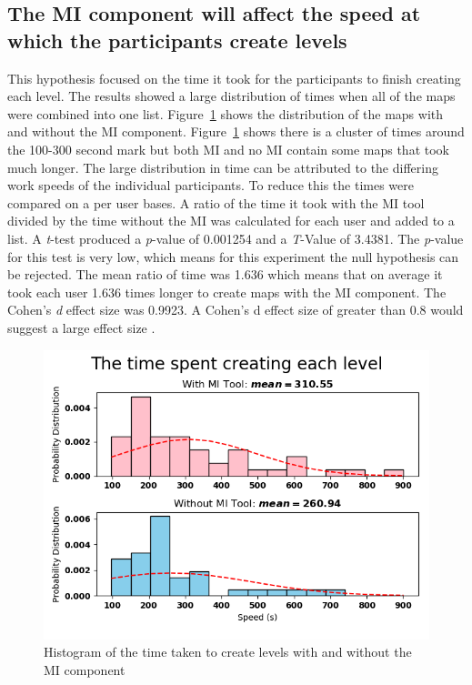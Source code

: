 \documentclass[journal]{IEEEtran}
\begin{document}
\subsection{The MI component will affect the speed at which the participants create levels}\label{speedSec}
This hypothesis focused on the time it took for the participants to finish creating each level. The results showed a large distribution of times when all of the maps were combined into one list.  Figure~\ref{speedDoubleHist} shows the distribution of the maps with and without the MI component. Figure~\ref{speedDoubleHist} shows there is a cluster of times around the 100-300 second mark but both MI and no MI contain some maps that took much longer. The large distribution in time can be attributed to the differing work speeds of the individual participants. To reduce this the times were compared on a per user bases. A ratio of the time it took with the MI tool divided by the time without the MI was calculated for each user and added to a list. A \textit{t}-test produced a \textit{p}-value of 0.001254 and a \textit{T}-Value of 3.4381. The \textit{p}-value for this test is very low, which means for this experiment the null hypothesis can be rejected. The mean ratio of time was 1.636 which means that on average it took each user 1.636 times longer to create maps with the MI component. The Cohen's \textit{d} effect size was 0.9923. A Cohen's d effect size of greater than 0.8 would suggest a large effect size \cite{cohen1988statistical}.

\begin{figure}[h]
	\includegraphics[width=1.0\linewidth]{Thetimespentcreatingeachlevel.png}
	\caption{Histogram of the time taken to create levels with and without the MI component}
	\label{speedDoubleHist}
\end{figure} 
\end{document}

